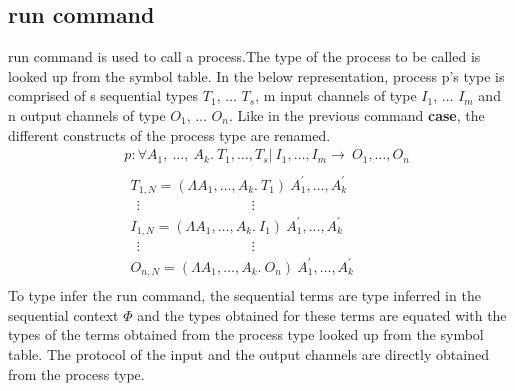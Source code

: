 \documentclass[11pt]{article}
\begin{document}
\subsection {run command}
{\sf run} command is used to call a process.The type of the process to be called is looked up from the symbol table. In the below representation, process p's type is comprised of s sequential types $T_1$, $\ldots$ $T_s$, m input channels of type $I_1$, $\ldots$ $I_m$ and n output channels of type $O_1$, $\ldots$ $O_n$. Like in the previous command {\bf\sf case}, the different constructs of the process type are renamed.
\begin{align*} 
 & p:\forall A_1,~ \ldots,~A_k.~T_1,\ldots,T_s | ~I_1,\ldots,I_m \to ~ O_1,\ldots,O_n 
 \\~\\
 & ~~ T_{1,N} = (\Lambda A_1,\ldots,A_k.~T_1)~A_1^{\prime},\ldots,A_k^{\prime} \\
 & ~~~~ \vdots \qquad\qquad \qquad\qquad \vdots \\  
 & ~~ I_{1,N} = (\Lambda A_1,\ldots,A_k.~I_1)~A_1^{\prime},\ldots,A_k^{\prime} \\
 & ~~~~ \vdots \qquad\qquad \qquad\qquad \vdots \\ 
 & ~~ O_{n,N} = (\Lambda A_1,\ldots,A_k.~ O_n)~A_1^{\prime},\ldots,A_k^{\prime} \\
\end{align*}
To type infer the run command, the sequential terms are type inferred in the sequential context $\Phi$ and the types obtained for these terms are equated with the types of the terms obtained from the process type looked up from the symbol table. The protocol of the input and the output channels are directly obtained from the process type. 
\end{document}
